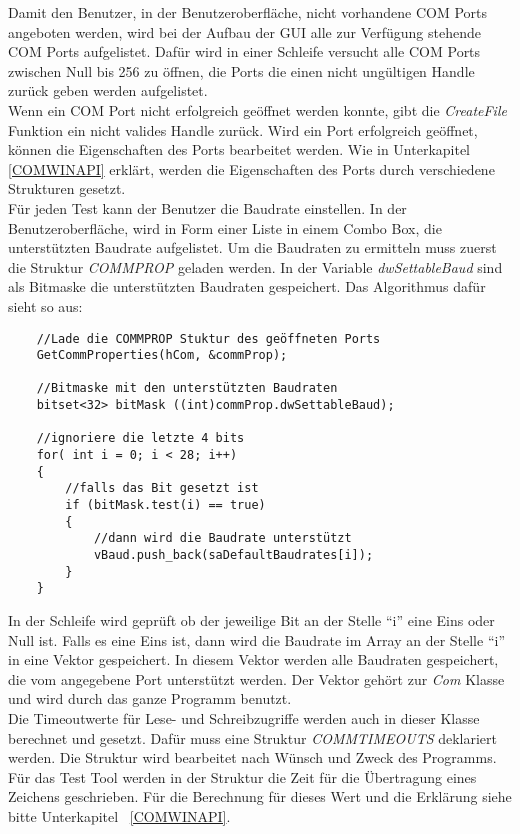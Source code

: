 Damit den Benutzer, in der Benutzeroberfläche, nicht vorhandene COM Ports angeboten werden, wird bei der Aufbau der GUI alle zur Verfügung stehende COM Ports aufgelistet. Dafür wird in einer Schleife versucht alle COM Ports zwischen Null bis 256 zu öffnen, die Ports die einen nicht ungültigen Handle zurück geben werden aufgelistet.\\


Wenn ein COM Port nicht erfolgreich geöffnet werden konnte, gibt die \textit{CreateFile} Funktion ein nicht valides Handle zurück. Wird ein Port erfolgreich geöffnet, können die Eigenschaften des Ports bearbeitet werden. Wie in Unterkapitel \ref{COMWINAPI} erklärt, werden die Eigenschaften des Ports durch verschiedene Strukturen gesetzt.\\

Für jeden Test kann der Benutzer die Baudrate einstellen. In der Benutzeroberfläche, wird in Form einer Liste in einem Combo Box, die unterstützten Baudrate aufgelistet. Um die Baudraten zu ermitteln muss zuerst die Struktur \textit{COMMPROP} geladen werden. In der Variable \textit{dwSettableBaud} sind als Bitmaske die unterstützten Baudraten gespeichert. Das Algorithmus dafür sieht so aus:

\begin{lstlisting}
	//Lade die COMMPROP Stuktur des geöffneten Ports	 
	GetCommProperties(hCom, &commProp);
 
 	//Bitmaske mit den unterstützten Baudraten
	bitset<32> bitMask ((int)commProp.dwSettableBaud);
	
	//ignoriere die letzte 4 bits
	for( int i = 0; i < 28; i++)
	{
		//falls das Bit gesetzt ist
		if (bitMask.test(i) == true)
		{
			//dann wird die Baudrate unterstützt
			vBaud.push_back(saDefaultBaudrates[i]);
		}
	}
\end{lstlisting}

In der Schleife wird geprüft ob der jeweilige Bit an der Stelle "`i"' eine Eins oder Null ist. Falls es eine Eins ist, dann wird die Baudrate im Array an der Stelle "`i"' in eine Vektor gespeichert. In diesem Vektor werden alle Baudraten gespeichert, die vom angegebene Port unterstützt werden. Der Vektor gehört zur \textit{Com} Klasse und wird durch das ganze Programm benutzt.\\

Die Timeoutwerte für Lese- und Schreibzugriffe werden auch in dieser Klasse berechnet und gesetzt. Dafür muss eine  Struktur \textit{COMMTIMEOUTS} deklariert werden. Die Struktur wird bearbeitet nach Wünsch und Zweck des Programms. Für das Test Tool werden in der Struktur die Zeit für die Übertragung eines Zeichens geschrieben. Für die Berechnung für dieses Wert und die Erklärung siehe bitte Unterkapitel ~\ref{COMWINAPI}.

